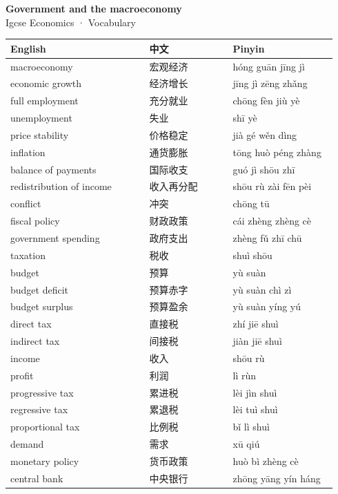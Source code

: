 \documentclass[11pt]{article}
\begin{document}
\begin{center}
  {\LARGE\bfseries Government and the macroeconomy}\\[0.35em]
  {\large Igcse Economics · Vocabulary}
\end{center}
\vspace{0.6em}

\begin{longtable}{@{}p{0.40\linewidth}p{0.24\linewidth}p{0.30\linewidth}@{}}
\toprule
\textbf{English} & \textbf{中文} & \textbf{Pinyin} \\
\midrule
\endhead
\bottomrule
\endlastfoot
macroeconomy & 宏观经济 & hóng guān jīng jì \\
economic growth & 经济增长 & jīng jì zēng zhǎng \\
full employment & 充分就业 & chōng fèn jiù yè \\
unemployment & 失业 & shī yè \\
price stability & 价格稳定 & jià gé wěn dìng \\
inflation & 通货膨胀 & tōng huò péng zhàng \\
balance of payments & 国际收支 & guó jì shōu zhī \\
redistribution of income & 收入再分配 & shōu rù zài fēn pèi \\
conflict & 冲突 & chōng tū \\
fiscal policy & 财政政策 & cái zhèng zhèng cè \\
government spending & 政府支出 & zhèng fǔ zhī chū \\
taxation & 税收 & shuì shōu \\
budget & 预算 & yù suàn \\
budget deficit & 预算赤字 & yù suàn chì zì \\
budget surplus & 预算盈余 & yù suàn yíng yú \\
direct tax & 直接税 & zhí jiē shuì \\
indirect tax & 间接税 & jiàn jiē shuì \\
income & 收入 & shōu rù \\
profit & 利润 & lì rùn \\
progressive tax & 累进税 & lèi jìn shuì \\
regressive tax & 累退税 & lèi tuì shuì \\
proportional tax & 比例税 & bǐ lì shuì \\
demand & 需求 & xū qiú \\
monetary policy & 货币政策 & huò bì zhèng cè \\
central bank & 中央银行 & zhōng yāng yín háng \\

\end{longtable}
\end{document}

